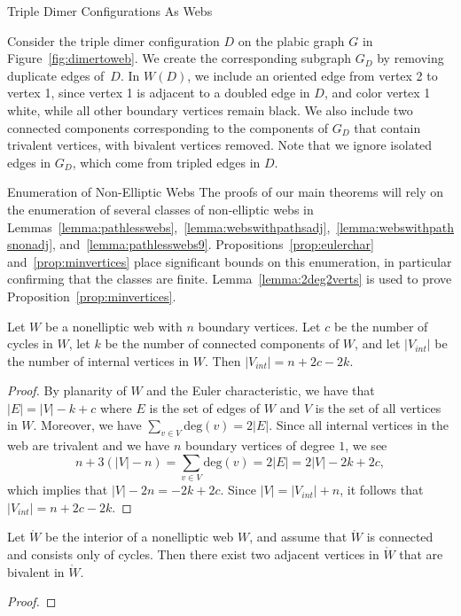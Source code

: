 \begin{subsection}{Triple Dimer Configurations As Webs}
\begin{exam}
Consider the triple dimer configuration $D$ on the plabic graph $G$ in Figure~\ref{fig:dimertoweb}. We create the corresponding subgraph $G_D$ by removing duplicate edges of~$D$. In $W(D)$, we include an oriented edge from vertex 2 to vertex 1, since vertex 1 is adjacent to a doubled edge in $D$, and color vertex 1 white, while all other boundary vertices remain black. We also include two connected components corresponding to the components of $G_D$ that contain trivalent vertices, with bivalent vertices removed. Note that we ignore isolated edges in $G_D$, which come from tripled edges in $D$.
\end{exam}
\end{subsection}

\begin{subsection}{Enumeration of Non-Elliptic Webs}
The proofs of our main theorems will rely on the enumeration of several classes of non-elliptic webs in Lemmas~\ref{lemma:pathlesswebs},~\ref{lemma:webswithpathsadj},~\ref{lemma:webswithpathsnonadj}, and~\ref{lemma:pathlesswebs9}. Propositions~\ref{prop:eulerchar} and~\ref{prop:minvertices} place significant bounds on this enumeration, in particular confirming that the classes are finite. Lemma~\ref{lemma:2deg2verts} is used to prove Proposition~\ref{prop:minvertices}.

\begin{prop}\label{prop:eulerchar}
Let $W$ be a nonelliptic web with $n$ boundary vertices. Let $c$ be the number of cycles in $W$, let $k$ be the number of connected components of $W$, and let $|V_{int}|$ be the number of internal vertices in $W$. Then $|V_{int}| = n+2c-2k$.
\end{prop}

\begin{proof}
By planarity of $W$ and the Euler characteristic, we have that $|E| = |V|-k+c$ where $E$ is the set of edges of $W$ and $V$ is the set of all vertices in $W$. Moreover, we have $\sum_{v \in V} \text{deg}(v) = 2|E|$. Since all internal vertices in the web are trivalent and we have $n$ boundary vertices of degree $1$, we see
\[n + 3(|V|-n) = \sum_{v \in V} \text{deg}(v) = 2|E| = 2|V| - 2k + 2c,\]
which implies that $|V| - 2n = -2k+2c$. Since $|V| = |V_{int}|+n$, it follows that $|V_{int}| = n+2c-2k$. 
\end{proof}

\begin{lemma}\label{lemma:2deg2verts}
Let $\mathring{W}$ be the interior of a nonelliptic web $W$, and assume that $\mathring{W}$ is connected and consists only of cycles. Then there exist two adjacent vertices in $\mathring{W}$ that are bivalent in $\mathring{W}$.
\end{lemma}
\begin{proof}


\end{proof}
\end{subsection}
